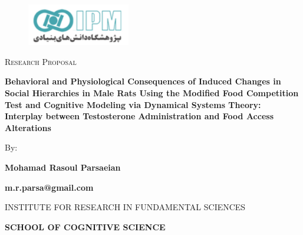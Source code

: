 \documentclass[english, a4paper, 11pt]{article}
\title{}
\author{}
\date{}
\begin{document}
\begin{center}

    \null\vfill
    \begin{figure}[htp]
        \centering
        \includegraphics[width=0.4\textwidth]{figures/IPMLogo.png}

    \end{figure}

    {\scshape\large Research Proposal\par}

    \baselineskip

    {\LARGE\bfseries Behavioral and Physiological Consequences of Induced Changes in Social Hierarchies in Male Rats Using the Modified Food Competition Test and Cognitive Modeling via Dynamical Systems Theory: Interplay between Testosterone Administration and Food Access Alterations\par}

    \baselineskip

    By:\\[1ex]
    {\LARGE\bfseries Mohamad Rasoul Parsaeian\par}
    {\small\bfseries m.r.parsa@gmail.com\par}

    \baselineskip

    INSTITUTE FOR RESEARCH
    IN FUNDAMENTAL SCIENCES\\[1ex]
    {\large\bfseries SCHOOL OF COGNITIVE SCIENCE\par}

\end{center}

\vfill

\begin{abstract}
    This research investigates the behavioral and physiological impacts of induced changes in social hierarchies among male rats using an automated system that controls food access through RFID-tagged interactions. Integrating theories such as the frustration-aggression hypothesis (FAH) and dominance hierarchy (DH), we examine how testosterone administration and food access alterations influence social dynamics, aggression, and stress responses within dyads of rats. Control theory principles are employed to design a Social System(SS) where an automated pellet dispenser and testosterone serve as actuators to manipulate or alter social status. Behavioral and physiological data will be collected and analyzed to elucidate the mechanisms underlying social hierarchy formation and maintenance, contributing to the broader understanding of social behavior and its neurobiological foundations.
\end{abstract}
\end{document}
